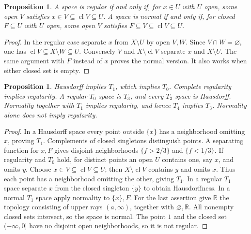\documentclass[11pt,oneside,openany]{book}
\newtheorem{proposition}[theorem]{Proposition}
\theoremstyle{definition}
\theoremstyle{remark}
\newcommand{\R}{\mathbb R}\newcommand{\C}{\mathbb C}
\DeclareMathOperator{\cl}{cl}
\begin{document}
\begin{proposition}\label{d10:07:shrinking}
A space is regular if and only if, for $x\in U$ with $U$ open, some open $V$ satisfies $x\in V\subseteq\cl V\subseteq U$. A space is normal if and only if, for closed $F\subseteq U$ with $U$ open, some open $V$ satisfies $F\subseteq V\subseteq\cl V\subseteq U$.
\end{proposition}
\begin{proof}
In the regular case separate $x$ from $X\setminus U$ by open $V,W$. Since $V\cap W=\varnothing$, one has $\cl V\subseteq X\setminus W\subseteq U$. Conversely $V$ and $X\setminus\cl V$ separate $x$ and $X\setminus U$. The same argument with $F$ instead of $x$ proves the normal version. It also works when either closed set is empty.
\end{proof}

\begin{proposition}\label{d10:07:hierarchy}
Hausdorff implies $T_1$, which implies $T_0$. Complete regularity implies regularity. A regular $T_0$ space is $T_3$, and every $T_3$ space is Hausdorff. Normality together with $T_1$ implies regularity, and hence $T_4$ implies $T_3$. Normality alone does not imply regularity.
\end{proposition}
\begin{proof}
In a Hausdorff space every point outside $\{x\}$ has a neighborhood omitting $x$, proving $T_1$. Complements of closed singletons distinguish points. A separating function for $x,F$ gives disjoint neighborhoods $\{f>2/3\}$ and $\{f<1/3\}$. If regularity and $T_0$ hold, for distinct points an open $U$ contains one, say $x$, and omits $y$. Choose $x\in V\subseteq\cl V\subseteq U$; then $X\setminus\cl V$ contains $y$ and omits $x$. Thus each point has a neighborhood omitting the other, giving $T_1$. In a regular $T_1$ space separate $x$ from the closed singleton $\{y\}$ to obtain Hausdorffness. In a normal $T_1$ space apply normality to $\{x\},F$. For the last assertion give $\R$ the topology consisting of upper rays $(a,\infty)$, together with $\varnothing,\R$. All nonempty closed sets intersect, so the space is normal. The point $1$ and the closed set $(-\infty,0]$ have no disjoint open neighborhoods, so it is not regular.
\end{proof}
\end{document}
